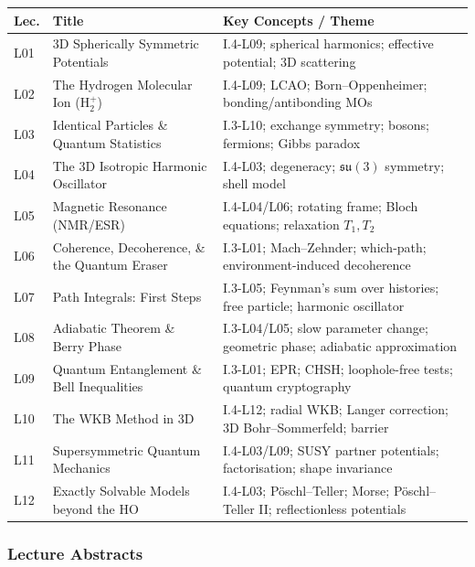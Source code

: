 \documentclass[11pt,a4paper]{article}
\begin{document}
{\footnotesize
\begin{center}
\begin{tabular}{@{}lp{4.2cm}p{6.8cm}@{}}
\toprule
\textbf{Lec.} & \textbf{Title} & \textbf{Key Concepts / Theme}\\
\midrule
L01 & 3D Spherically Symmetric Potentials & I.4-L09; spherical harmonics; effective potential; 3D scattering\\
L02 & The Hydrogen Molecular Ion (H$_2^+$) & I.4-L09; LCAO; Born--Oppenheimer; bonding/antibonding MOs\\
L03 & Identical Particles \& Quantum Statistics & I.3-L10; exchange symmetry; bosons; fermions; Gibbs paradox\\
L04 & The 3D Isotropic Harmonic Oscillator & I.4-L03; degeneracy; $\mathfrak{su}(3)$ symmetry; shell model\\
L05 & Magnetic Resonance (NMR/ESR) & I.4-L04/L06; rotating frame; Bloch equations; relaxation $T_1,T_2$\\
L06 & Coherence, Decoherence, \& the Quantum Eraser & I.3-L01; Mach--Zehnder; which-path; environment-induced decoherence\\
\midrule
L07 & Path Integrals: First Steps & I.3-L05; Feynman's sum over histories; free particle; harmonic oscillator\\
L08 & Adiabatic Theorem \& Berry Phase & I.3-L04/L05; slow parameter change; geometric phase; adiabatic approximation\\
L09 & Quantum Entanglement \& Bell Inequalities & I.3-L01; EPR; CHSH; loophole-free tests; quantum cryptography\\
L10 & The WKB Method in 3D & I.4-L12; radial WKB; Langer correction; 3D Bohr--Sommerfeld; barrier\\
L11 & Supersymmetric Quantum Mechanics & I.4-L03/L09; SUSY partner potentials; factorisation; shape invariance\\
L12 & Exactly Solvable Models beyond the HO & I.4-L03; P\"oschl--Teller; Morse; P\"oschl--Teller II; reflectionless potentials\\
\bottomrule
\end{tabular}
\end{center}
}

\subsubsection*{Lecture Abstracts}
\end{document}

